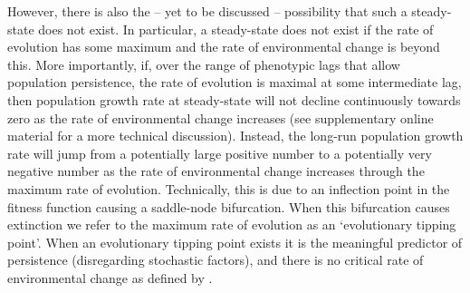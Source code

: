 \documentclass[12pt,letterpaper]{article} %
\begin{document}
However, there is also the -- yet to be discussed -- possibility that such a steady-state does not exist.
In particular, a steady-state does not exist if the rate of evolution has some maximum and the rate of environmental change is beyond this.
More importantly, if, over the range of phenotypic lags that allow population persistence, 
the rate of evolution is maximal at some intermediate lag, 
then population growth rate at steady-state will not decline continuously towards zero as the rate of environmental change increases (see supplementary online material for a more technical discussion).
%
Instead, the long-run population growth rate will jump from a potentially large positive number to a potentially very negative number as the rate of environmental change increases through the maximum rate of evolution.
Technically, this is due to an inflection point in the fitness function causing a saddle-node bifurcation.
When this bifurcation causes extinction we refer to the maximum rate of evolution as an `evolutionary tipping point'. %
When an evolutionary tipping point exists it is the meaningful predictor of persistence (disregarding stochastic factors), and there is no critical rate of environmental change as defined by \cite{Lynch1993}.
\end{document}
